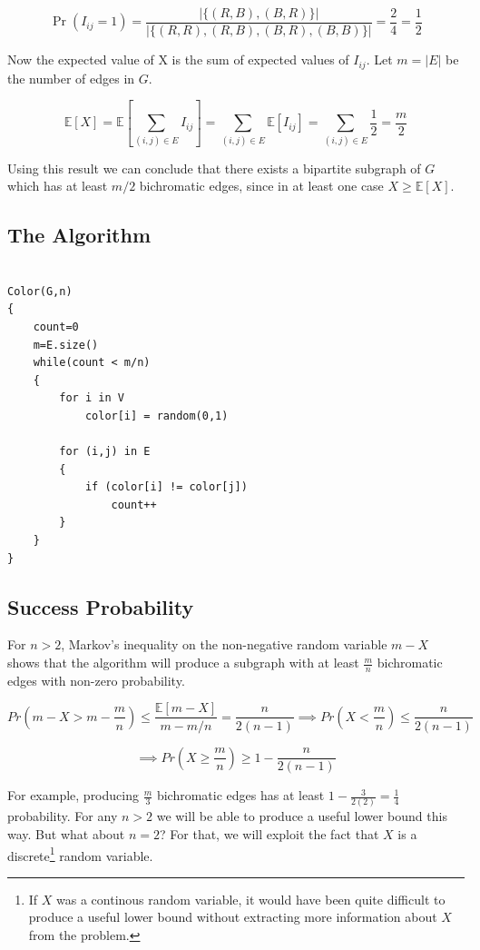 \[
\Pr(I_{ij}=1)
=
\frac{\left|\{(R,B),(B,R)\}\right|}
     {\left|\{(R,R),(R,B),(B,R),(B,B)\}\right|}
=
\frac{2}{4}
=
\frac{1}{2}
\]

Now the expected value of X is the sum of expected values of $I_{ij}$. Let $m=|E|$ be the number of edges in $G$.

\[
\mathbb E[X]=\mathbb E[\sum_{(i,j) \in E} I_{ij}] = \sum_{(i,j) \in E} \mathbb E[I_{ij}] = \sum_{(i,j) \in E} \frac{1}{2} = \frac{m}{2}
\]


Using this result we can conclude that there exists a bipartite subgraph of $G$ which has at least $m/2$ 
bichromatic edges, since in at least one case $X \ge \mathbb E[X]$. 

\subsection{The Algorithm}
\begin{center}
\begin{minipage}{0.9\linewidth}
\begin{framed}
\begin{Verbatim}

Color(G,n)
{
    count=0
    m=E.size()
    while(count < m/n)
    {
        for i in V
            color[i] = random(0,1)
        
        for (i,j) in E
        {
            if (color[i] != color[j])
                count++
        }
    }
}
\end{Verbatim}
\vspace{-4mm}
\end{framed}
\end{minipage}
\end{center}

\subsection{Success Probability}
For $n>2$, Markov's inequality on the non-negative random variable $m-X$ shows that 
the algorithm will produce a subgraph with at least $\frac{m}{n}$ bichromatic edges 
with non-zero probability.

\[
Pr(m-X > m-\frac{m}{n}) \le \frac{\mathbb E[m-X]}{m-m/n} = \frac{n}{2(n-1)}
\implies
Pr(X < \frac{m}{n}) \le \frac{n}{2(n-1)}
\]

\[
\implies
Pr(X \ge \frac{m}{n}) \ge 1-\frac{n}{2(n-1)}
\]

For example, producing $\frac{m}{3}$ bichromatic edges has at least $1-\frac{3}{2(2)} = \frac{1}{4}$ probability.
For any $n>2$ we will be able to produce a useful lower bound this way. But what about $n=2$? For that, we will 
exploit the fact that $X$ is a discrete\footnote{If $X$ was a continous random variable, it would have been 
quite difficult to produce a useful lower bound without extracting more information about $X$ from the 
problem.} random variable.\\


